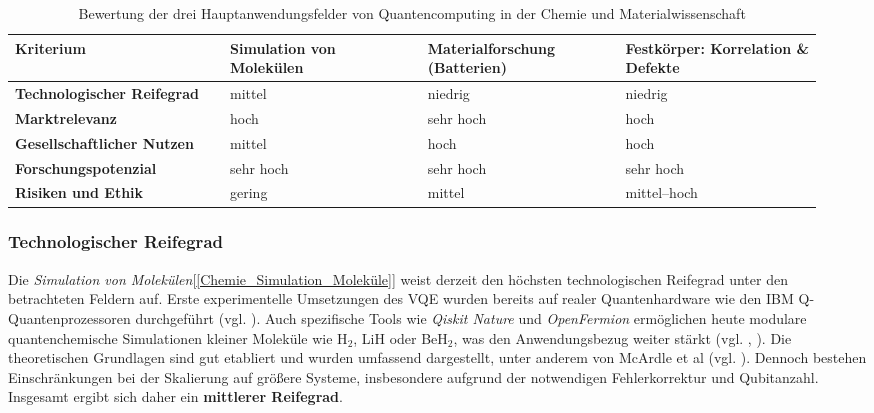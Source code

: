 \begin{table}[h]
\centering
\begin{tabular}{|p{0.25\linewidth}|p{0.23\linewidth}|p{0.23\linewidth}|p{0.23\linewidth}|}
\hline
\textbf{Kriterium} & \textbf{Simulation von Molekülen} & \textbf{Materialforschung (Batterien)} & \textbf{Festkörper: Korrelation \& Defekte} \\
\hline
\textbf{Techno\-logischer Reife\-grad} & mittel & niedrig & niedrig \\
\hline
\textbf{Markt\-relevanz} & hoch & sehr hoch & hoch \\
\hline
\textbf{Gesell\-schaft\-licher Nutzen} & mittel & hoch & hoch \\
\hline
\textbf{Forschungs\-potenzial} & sehr hoch & sehr hoch & sehr hoch \\
\hline
\textbf{Risiken und Ethik} & gering & mittel & mittel--hoch \\
\hline
\end{tabular}
\caption{Bewertung der drei Hauptanwendungsfelder von Quantencomputing in der Chemie und Materialwissenschaft}
\label{tab:qc-chemie-bewertung}
\end{table}



\subsubsection{Technologischer Reifegrad}

Die \textit{Simulation von Molekülen}[\ref{Chemie_Simulation_Moleküle}] weist derzeit den höchsten technologischen Reifegrad unter den betrachteten Feldern auf. Erste experimentelle Umsetzungen des VQE wurden bereits auf realer Quantenhardware wie den IBM Q-Quantenprozessoren durchgeführt (vgl. \cite{kandala_hardware-efficient_2017}). Auch spezifische Tools wie \textit{Qiskit Nature} und \textit{OpenFermion} ermöglichen heute modulare quantenchemische Simulationen kleiner Moleküle wie H$_2$, LiH oder BeH$_2$, was den Anwendungsbezug weiter stärkt (vgl. \cite{the_qiskit_nature_development_team_qiskit_2023}, \cite{mcardle_quantum_2020}). Die theoretischen Grundlagen sind gut etabliert und wurden umfassend dargestellt, unter anderem von McArdle et al (vgl. \cite{mcardle_quantum_2020}). Dennoch bestehen Einschränkungen bei der Skalierung auf größere Systeme, insbesondere aufgrund der notwendigen Fehlerkorrektur und Qubitanzahl. Insgesamt ergibt sich daher ein \textbf{mittlerer Reifegrad}.

\vspace{0.5em}

